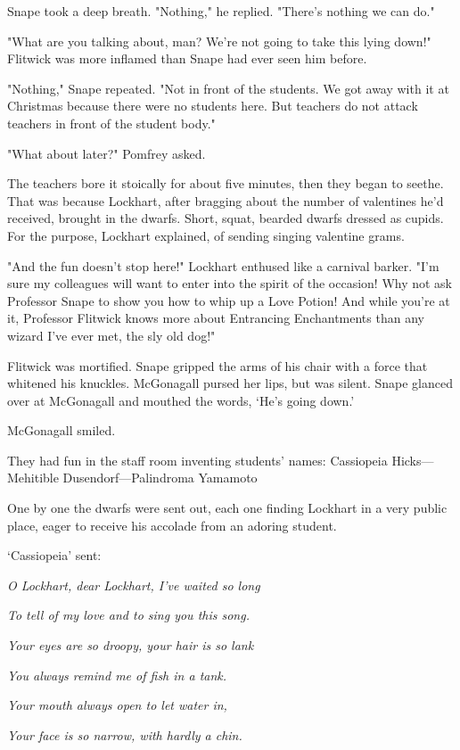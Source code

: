 Snape took a deep breath. "Nothing," he replied. "There's nothing we can do."

"What are you talking about, man? We're not going to take this lying down!" Flitwick was more inflamed than Snape had ever seen him before.

"Nothing," Snape repeated. "Not in front of the students. We got away with it at Christmas because there were no students here. But teachers do not attack teachers in front of the student body."

"What about later?" Pomfrey asked.

The teachers bore it stoically for about five minutes, then they began to seethe. That was because Lockhart, after bragging about the number of valentines he'd received, brought in the dwarfs. Short, squat, bearded dwarfs dressed as cupids. For the purpose, Lockhart explained, of sending singing valentine grams.

"And the fun doesn't stop here!" Lockhart enthused like a carnival barker. "I'm sure my colleagues will want to enter into the spirit of the occasion! Why not ask Professor Snape to show you how to whip up a Love Potion! And while you're at it, Professor Flitwick knows more about Entrancing Enchantments than any wizard I've ever met, the sly old dog!"

Flitwick was mortified. Snape gripped the arms of his chair with a force that whitened his knuckles. McGonagall pursed her lips, but was silent. Snape glanced over at McGonagall and mouthed the words, `He's going down.'

McGonagall smiled.

They had fun in the staff room inventing students' names: Cassiopeia Hicks—Mehitible Dusendorf—Palindroma Yamamoto{\el}

One by one the dwarfs were sent out, each one finding Lockhart in a very public place, eager to receive his accolade from an adoring student.

`Cassiopeia' sent:

\emph{O Lockhart, dear Lockhart, I've waited so long}

\emph{To tell of my love and to sing you this song.}

\emph{Your eyes are so droopy, your hair is so lank}

\emph{You always remind me of fish in a tank.}

\emph{Your mouth always open to let water in,}

\emph{Your face is so narrow, with hardly a chin.}

